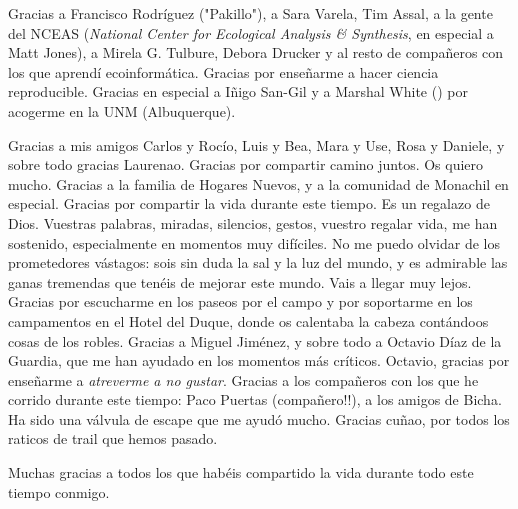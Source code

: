 Gracias a Francisco Rodríguez ("Pakillo"), a Sara Varela, Tim Assal, a la gente del NCEAS (\emph{National Center for Ecological Analysis \& Synthesis}, en especial a Matt Jones), a Mirela G. Tulbure, Debora Drucker y al resto de compañeros con los que aprendí ecoinformática. Gracias por enseñarme a hacer ciencia reproducible. Gracias en especial a Iñigo San-Gil y a Marshal White (\dag) por acogerme en la UNM (Albuquerque). 

Gracias a mis amigos Carlos y Rocío, Luis y Bea, Mara y Use, Rosa y Daniele, y sobre todo gracias Laurenao. Gracias por compartir camino juntos. Os quiero mucho. Gracias a la familia de Hogares Nuevos, y a la comunidad de Monachil en especial. Gracias por compartir la vida durante este tiempo. Es un regalazo de Dios. Vuestras palabras, miradas, silencios, gestos, vuestro regalar vida, me han sostenido, especialmente en momentos muy difíciles. No me puedo olvidar de los prometedores vástagos: sois sin duda la sal y la luz del mundo, y es admirable las ganas tremendas que tenéis de mejorar este mundo. Vais a llegar muy lejos. Gracias por escucharme en los paseos por el campo y por soportarme en los campamentos en el Hotel del Duque, donde os calentaba la cabeza contándoos cosas de los robles. Gracias a Miguel Jiménez, y sobre todo a Octavio Díaz de la Guardia, que me han ayudado en los momentos más críticos. Octavio, gracias por enseñarme a \emph{atreverme a no gustar}. Gracias a los compañeros con los que he corrido durante este tiempo: Paco Puertas (compañero!!), a los amigos de Bicha. Ha sido una válvula de escape que me ayudó mucho. Gracias cuñao, por todos los raticos de trail que hemos pasado. 

Muchas gracias a todos los que habéis compartido la vida durante todo este tiempo conmigo.

\normalsize